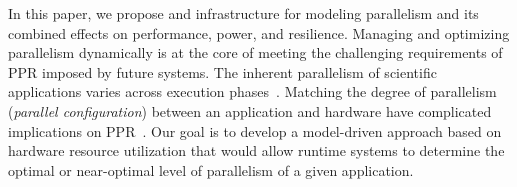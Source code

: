 \documentclass{article}  %
\begin{document}

In this paper, we propose and infrastructure for modeling parallelism
and its combined effects on performance, power, and
resilience. Managing and optimizing parallelism dynamically is at the
core of meeting the challenging requirements of PPR imposed by future 
systems. The inherent parallelism of scientific applications varies
across execution phases~\cite{nvram_ipdps12}.  Matching the degree of
parallelism (\textit{parallel configuration}) between an application and
hardware have complicated implications on PPR~\cite{mpiopenmp_ipdps10,
  mpiopenmp_tpds13, dsn_pact08, dsn_ics06}. Our goal is to develop a
model-driven approach based on hardware resource utilization that
would allow runtime systems to determine the optimal or near-optimal
level of parallelism of a given application. 




\end{document}
